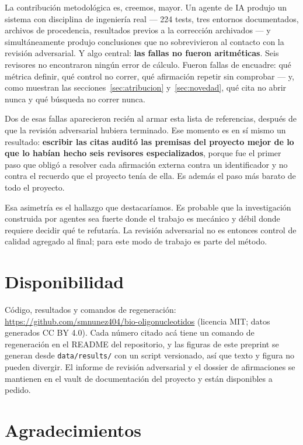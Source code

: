 \documentclass[11pt,a4paper]{article}
\begin{document}
La contribución metodológica es, creemos, mayor. Un agente de IA produjo un sistema con disciplina de
ingeniería real --- 224 tests, tres entornos documentados, archivos de procedencia, resultados
previos a la corrección archivados --- y simultáneamente produjo conclusiones que no sobrevivieron al
contacto con la revisión adversarial. Y algo central: \textbf{las fallas no fueron aritméticas}. Seis
revisores no encontraron ningún error de cálculo. Fueron fallas de encuadre: qué métrica definir, qué
control no correr, qué afirmación repetir sin comprobar --- y, como muestran las
secciones~\ref{sec:atribucion} y~\ref{sec:novedad}, qué cita no abrir nunca y qué búsqueda no
correr nunca.

Dos de esas fallas aparecieron recién al armar esta lista de referencias, después de que la revisión
adversarial hubiera terminado. Ese momento es en sí mismo un resultado: \textbf{escribir las citas
auditó las premisas del proyecto mejor de lo que lo habían hecho seis revisores especializados},
porque fue el primer paso que obligó a resolver cada afirmación externa contra un identificador y no
contra el recuerdo que el proyecto tenía de ella. Es además el paso más barato de todo el proyecto.

Esa asimetría es el hallazgo que destacaríamos. Es probable que la investigación construida por
agentes sea fuerte donde el trabajo es mecánico y débil donde requiere decidir qué te refutaría. La
revisión adversarial no es entonces control de calidad agregado al final; para este modo de trabajo
es parte del método.

\section{Disponibilidad}
\label{sec:disponibilidad}

Código, resultados y comandos de regeneración: \url{https://github.com/smnunez404/bio-oligonucleotidos}
(licencia MIT; datos generados CC BY 4.0). Cada número citado acá tiene un comando de regeneración en
el README del repositorio, y las figuras de este preprint se generan desde \texttt{data/results/} con
un script versionado, así que texto y figura no pueden divergir. El informe de revisión adversarial y
el dossier de afirmaciones se mantienen en el vault de documentación del proyecto y están disponibles
a pedido.

\section*{Agradecimientos}
\end{document}
